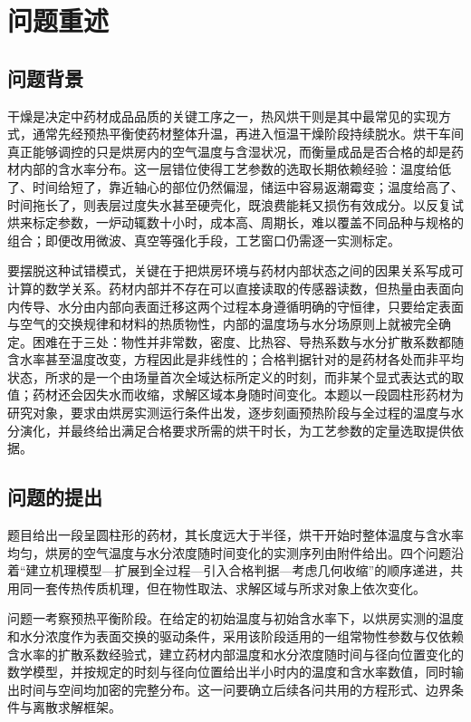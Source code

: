 \section{问题重述}

\subsection{问题背景}

干燥是决定中药材成品品质的关键工序之一，热风烘干则是其中最常见的实现方式，通常先经预热平衡使药材整体升温，再进入恒温干燥阶段持续脱水。烘干车间真正能够调控的只是烘房内的空气温度与含湿状况，而衡量成品是否合格的却是药材内部的含水率分布。这一层错位使得工艺参数的选取长期依赖经验：温度给低了、时间给短了，靠近轴心的部位仍然偏湿，储运中容易返潮霉变；温度给高了、时间拖长了，则表层过度失水甚至硬壳化，既浪费能耗又损伤有效成分。以反复试烘来标定参数，一炉动辄数十小时，成本高、周期长，难以覆盖不同品种与规格的组合；即便改用微波、真空等强化手段，工艺窗口仍需逐一实测标定。

要摆脱这种试错模式，关键在于把烘房环境与药材内部状态之间的因果关系写成可计算的数学关系。药材内部并不存在可以直接读取的传感器读数，但热量由表面向内传导、水分由内部向表面迁移这两个过程本身遵循明确的守恒律，只要给定表面与空气的交换规律和材料的热质物性，内部的温度场与水分场原则上就被完全确定。困难在于三处：物性并非常数，密度、比热容、导热系数与水分扩散系数都随含水率甚至温度改变，方程因此是非线性的；合格判据针对的是药材各处而非平均状态，所求的是一个由场量首次全域达标所定义的时刻，而非某个显式表达式的取值；药材还会因失水而收缩，求解区域本身随时间变化。本题以一段圆柱形药材为研究对象，要求由烘房实测运行条件出发，逐步刻画预热阶段与全过程的温度与水分演化，并最终给出满足合格要求所需的烘干时长，为工艺参数的定量选取提供依据。

\subsection{问题的提出}

题目给出一段呈圆柱形的药材，其长度远大于半径，烘干开始时整体温度与含水率均匀，烘房的空气温度与水分浓度随时间变化的实测序列由附件给出。四个问题沿着“建立机理模型—扩展到全过程—引入合格判据—考虑几何收缩”的顺序递进，共用同一套传热传质机理，但在物性取法、求解区域与所求对象上依次变化。

问题一考察预热平衡阶段。在给定的初始温度与初始含水率下，以烘房实测的温度和水分浓度作为表面交换的驱动条件，采用该阶段适用的一组常物性参数与仅依赖含水率的扩散系数经验式，建立药材内部温度和水分浓度随时间与径向位置变化的数学模型，并按规定的时刻与径向位置给出半小时内的温度和含水率数值，同时输出时间与空间均加密的完整分布。这一问要确立后续各问共用的方程形式、边界条件与离散求解框架。

